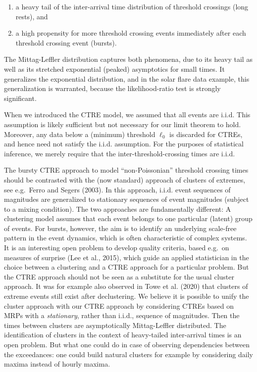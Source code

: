\documentclass[]{elsarticle} %
\begin{document}
\begin{enumerate}
\def\labelenumi{\roman{enumi})}
\item
  a heavy tail of the inter-arrival time distribution of threshold
  crossings (long rests), and
\item
  a high propensity for more threshold crossing events immediately after
  each threshold crossing event (bursts).
\end{enumerate}

The Mittag-Leffler distribution captures both phenomena, due to its
heavy tail as well as its stretched exponential (peaked) asymptotics for
small times. It generalizes the exponential distribution, and in the
solar flare data example, this generalization is warranted, because the
likelihood-ratio test is strongly significant.

When we introduced the CTRE model, we assumed that all events are i.i.d.
This assumption is likely sufficient but not necessary for our limit
theorem to hold. Moreover, any data below a (minimum) threshold
\(\ell_0\) is discarded for CTREs, and hence need not satisfy the i.i.d.
assumption. For the purposes of statistical inference, we merely require
that the inter-threshold-crossing times are i.i.d.

The bursty CTRE approach to model ``non-Poissonian'' threshold crossing
times should be contrasted with the (now standard) approach of clusters
of extremes, see e.g.~Ferro and Segers (2003). In this approach, i.i.d.
event sequences of magnitudes are generalized to stationary sequences of
event magnitudes (subject to a mixing condition). The two approaches are
fundamentally different: A clustering model assumes that each event
belongs to one particular (latent) group of events. For bursts, however,
the aim is to identify an underlying scale-free pattern in the event
dynamics, which is often characteristic of complex systems. It is an
interesting open problem to develop quality criteria, based e.g.~on
measures of surprise (Lee et al., 2015), which guide an applied
statistician in the choice between a clustering and a CTRE approach for
a particular problem. But the CTRE approach should not be seen as a
substitute for the usual cluster approach. It was for example also
observed in Towe et al. (2020) that clusters of extreme events still
exist after declustering. We believe it is possible to unify the cluster
approach with our CTRE approach by considering CTREs based on MRPs with
a \emph{stationary}, rather than i.i.d., sequence of magnitudes. Then
the times between clusters are asymptotically Mittag-Leffler
distributed. The identification of clusters in the context of
heavy-tailed inter-arrival times is an open problem. But what one could
do in case of observing dependencies between the exceedances: one could
build natural clusters for example by considering daily maxima instead
of hourly maxima.
\end{document}
